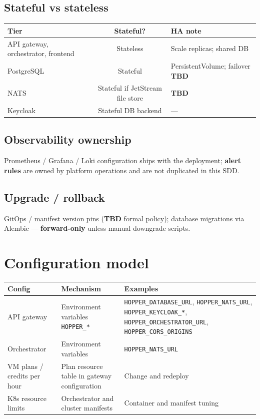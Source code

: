 \documentclass[12pt,a4paper]{article}
\begin{document}
\subsection{Stateful vs stateless}
\begin{tabularx}{\textwidth}{@{}L{4.5cm} c X@{}}
  \toprule
  \textbf{Tier} & \textbf{Stateful?} & \textbf{HA note} \\
  \midrule
  API gateway, orchestrator, frontend & Stateless & Scale replicas; shared DB \\
  PostgreSQL & Stateful & PersistentVolume; failover \textbf{TBD} \\
  NATS & Stateful if JetStream file store & \textbf{TBD} \\
  Keycloak & Stateful DB backend & --- \\
  \bottomrule
\end{tabularx}

\subsection{Observability ownership}
Prometheus / Grafana / Loki configuration ships with the deployment; \textbf{alert rules} are owned by platform operations and are not duplicated in this SDD.

\subsection{Upgrade / rollback}
GitOps / manifest version pins (\textbf{TBD} formal policy); database migrations via Alembic --- \textbf{forward-only} unless manual downgrade scripts.

\section{Configuration model}
\label{app:config}

\begin{tabularx}{\textwidth}{@{}L{3.2cm} L{3.5cm} X@{}}
  \toprule
  \textbf{Config} & \textbf{Mechanism} & \textbf{Examples} \\
  \midrule
  API gateway & Environment variables \texttt{HOPPER\_*} & \texttt{HOPPER\_DATABASE\_URL}, \texttt{HOPPER\_NATS\_URL}, \texttt{HOPPER\_KEYCLOAK\_*}, \texttt{HOPPER\_ORCHESTRATOR\_URL}, \texttt{HOPPER\_CORS\_ORIGINS} \\
  Orchestrator & Environment variables & \texttt{HOPPER\_NATS\_URL} \\
  VM plans / credits per hour & Plan resource table in gateway configuration & Change and redeploy \\
  K8s resource limits & Orchestrator and cluster manifests & Container and manifest tuning \\
  \bottomrule
\end{tabularx}
\end{document}
